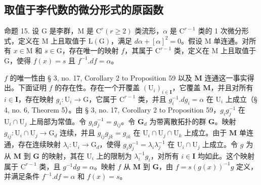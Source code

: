 \subsection{取值于李代数的微分形式的原函数}

命题 15. 设 \(\mathrm{G}\) 是李群，\(\mathrm{M}\) 是 \(\mathrm{C}^r (r\geqslant 2)\) 类流形，\(\alpha\) 是 \(\mathrm{C}^{r - 1}\) 类的 1 次微分形式，定义在 \(\mathrm{M}\) 上且取值于 \(\mathrm{L}(\mathrm{G})\)，满足 \(d\alpha +[\alpha ]^2 = 0\)。假设 \(\mathrm{M}\) 单连通。对所有 \(x\in \mathrm{M}\) 和 \(s\in \mathrm{G}\)，存在唯一的映射 \(f\)，其属于 \(\mathrm{C}^{r - 1}\) 类，定义在 \(\mathrm{M}\) 上且取值于 \(\mathrm{G}\)，使得 \(f(x) = s\) 且 \(f^{-1}.df = \alpha\)。

\(f\) 的唯一性由 § 3, no. 17, Corollary 2 to Proposition 59 以及 \(\mathbf{M}\) 连通这一事实得出。下面证明 \(f\) 的存在性。存在一个开覆盖 \((\mathrm{U}_i)_{i\in \mathbf{I}}\)，它覆盖 \(\mathbf{M}\)，并且对所有 \(i\in \mathbf{I}\)，存在映射 \(g_i: \mathrm{U}_i\to \mathrm{G}\)，它属于 \(\mathrm{C}^{r - 1}\) 类，并且 \(g_i^{-1}.d g_i = \alpha\) 在 \(\mathrm{U}_i\) 上成立（§ 4, no. 6, Theorem 5）。由 § 3, no. 17, Corollary 2 to Proposition 59，\(g_i g_j^{-1}\) 在 \(\mathrm{U}_i\cap \mathrm{U}_j\) 上局部为常值。令 \(g_i g_j^{-1} = g_{ij}\)。令 \(\mathbf{G}_d\) 为带离散拓扑的群 \(\mathbf{G}\)。映射 \(g_{ij}: \mathrm{U}_i\cap \mathrm{U}_j\to \mathrm{G}_d\) 连续，并且 \(g_{ij}g_{jk} = g_{ik}\) 在 \(\mathrm{U}_i\cap \mathrm{U}_j\cap \mathrm{U}_k\) 上成立。由于 \(\mathbf{M}\) 单连通，存在连续映射 \(\lambda_i: \mathrm{U}_i\to \mathrm{G}_d\)，使得 \(g_i g_j^{-1} = \lambda_i\lambda_j^{-1}\) 在 \(\mathrm{U}_i\cap \mathrm{U}_j\) 上成立。令 \(g\) 为从 \(\mathbf{M}\) 到 \(\mathbf{G}\) 的映射，其在 \(\mathrm{U}_i\) 上的限制为 \(\lambda_i^{-1}g_i\)，对所有 \(i\in \mathbf{I}\) 均如此。这个映射属于 \(\mathrm{C}^{r - 1}\) 类，且 \(g^{-1}d g = \alpha\)。映射 \(f\) 从 \(\mathbf{M}\) 到 \(\mathbf{G}\)，由 \(f = s(g(x))^{-1}g\) 定义，并满足条件 \(f^{-1}.df = \alpha\) 和 \(f(x) = s\)。

